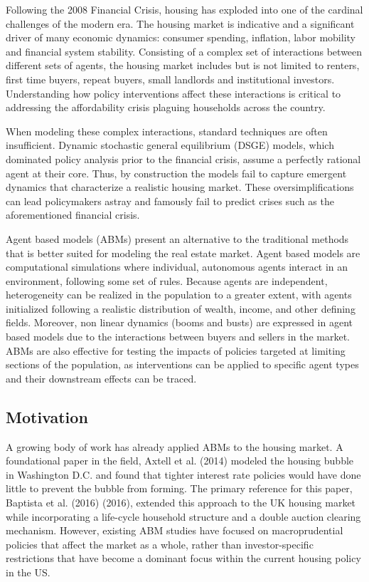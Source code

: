 \documentclass[twocolumn,showpacs,%
  nofootinbib,aps,superscriptaddress,%
  eqsecnum,prd,notitlepage,showkeys,10pt]{revtex4-1}
\begin{document}
Following the 2008 Financial Crisis, housing has exploded into one of the cardinal challenges of the modern era. The housing market is indicative and a significant driver of many economic dynamics: consumer spending, inflation, labor mobility and financial system stability. Consisting of a complex set of interactions between different sets of agents, the housing market includes but is not limited to renters, first time buyers, repeat buyers, small landlords and institutional investors. Understanding how policy interventions affect these interactions is critical to addressing the affordability crisis plaguing households across the country. \newline

When modeling these complex interactions, standard techniques are often insufficient. Dynamic stochastic general equilibrium (DSGE) models, which dominated policy analysis prior to the financial crisis, assume a perfectly rational agent at their core. Thus, by construction the models fail to capture emergent dynamics \cite{tesfatsion2006} that characterize a realistic housing market. These oversimplifications can lead policymakers astray and famously fail to predict crises such as the aforementioned financial crisis. \newline

Agent based models (ABMs) present an alternative to the traditional methods that is better suited for modeling the real estate market. Agent based models are computational simulations where individual, autonomous agents interact in an environment, following some set of rules. Because agents are independent, heterogeneity can be realized in the population to a greater extent, with agents initialized following a realistic distribution of wealth, income, and other defining fields. Moreover, non linear dynamics (booms and busts) are expressed in agent based models due to the interactions between buyers and sellers in the market. 
ABMs are also effective for testing the impacts of policies targeted at limiting sections of the population, as interventions can be applied to specific agent types and their downstream effects can be traced. \newline

\subsection{Motivation}

A growing body of work has already applied ABMs to the housing market. A foundational paper in the field, Axtell et al. (2014) \cite{axtell2014} modeled the housing bubble in Washington D.C. and found that tighter interest rate policies would have done little to prevent the bubble from forming. The primary reference for this paper, Baptista et al. (2016) (2016)\cite{baptista2016}, extended this approach to the UK housing market while incorporating a life-cycle household structure and a double auction clearing mechanism. However, existing ABM studies have focused on macroprudential policies that affect the market as a whole, rather than investor-specific restrictions that have become a dominant focus within the current housing policy in the US. \newline
\end{document}
